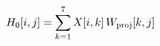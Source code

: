 \documentclass[preview]{standalone}
\begin{document}
\begin{align*}
\special{dvisvgm:raw <g id='unique000'>}H_0[i,j] = \sum_{k=1}^{7} X[i,k]\, W_{\mathrm{proj}}[k,j]\special{dvisvgm:raw </g>}
\end{align*}
\end{document}
